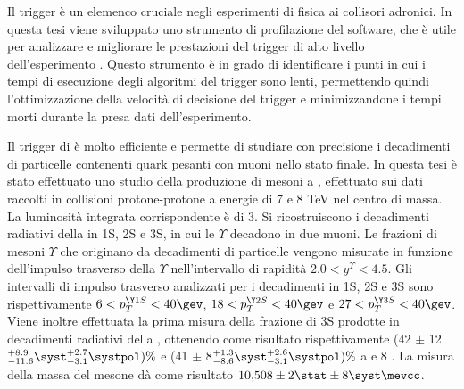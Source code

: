 Il trigger \`e un elemenco cruciale negli esperimenti di fisica ai collisori adronici. 
In questa tesi viene sviluppato uno strumento di profilazione del software, che \`e 
utile per analizzare e migliorare le prestazioni del trigger di alto livello dell'esperimento 
\lhcb. Questo strumento \`e in grado di identificare i punti in cui i tempi di esecuzione 
degli algoritmi del trigger sono lenti, permettendo quindi l'ottimizzazione della 
velocit\`a di decisione del trigger e minimizzandone i tempi morti durante la presa dati 
dell'esperimento. 

Il trigger di \lhcb \`e molto efficiente e permette di studiare con precisione i decadimenti 
di particelle contenenti quark pesanti con muoni nello stato finale. 
In questa tesi \`e stato effettuato uno studio della produzione di mesoni \chib a \lhcb, 
effettuato sui dati raccolti in collisioni protone-protone a energie di 7 e 8 TeV nel 
centro di massa. La luminosit\`a integrata corrispondente \`e di 3\invfb. 
Si ricostruiscono i decadimenti radiativi della \chib in  
\Y1S, \Y2S e \Y3S, in cui le $\Upsilon$ decadono in due muoni. 
Le frazioni di mesoni $\Upsilon$ che originano da decadimenti di particelle \chib 
vengono misurate in funzione dell'impulso trasverso della 
$\Upsilon$ nell'intervallo di rapidit\`a 
$2.0 < y^{\Upsilon} < 4.5$. Gli intervalli di impulso trasverso analizzati per 
i decadimenti in \Y1S, \Y2S e \Y3S sono rispettivamente  $6<p_T^{\Y1S}<40\gev$, 
$18<p_T^{\Y2S}<40\gev$ e $27<p_T^{\Y3S}<40\gev$. 
Viene inoltre effettuata la prima misura della frazione di \Y3S prodotte in decadimenti radiativi della 
\chibThreeP, ottenendo come risultato rispettivamente 
(42 $\pm$ 12\stat${}^{+8.9}_{-11.6}\syst^{+2.7}_{-3.1}\systpol) \%$ e 
(41 $\pm$ 8\stat${}^{+1.3}_{-8.6}\syst^{+2.6}_{-3.1}\systpol) \%$ a  e 8 \tev. 
La misura della massa del mesone \chiboneThreeP d\`a come risultato $10{,}508 \pm 2\stat \pm
8\syst \mevcc$.


